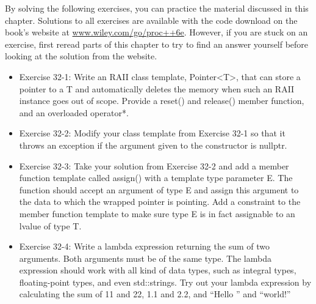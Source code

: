 By solving the following exercises, you can practice the material discussed in this chapter. Solutions to all exercises are available with the code download on the book’s website at \url{www.wiley.com/go/proc++6e}. However, if you are stuck on an exercise, first reread parts of this chapter to try to find an answer yourself before looking at the solution from the website.

\begin{itemize}
\item
Exercise 32-1: Write an RAII class template, Pointer<T>, that can store a pointer to a T and automatically deletes the memory when such an RAII instance goes out of scope. Provide a reset() and release() member function, and an overloaded operator*.

\item
Exercise 32-2: Modify your class template from Exercise 32-1 so that it throws an exception if the argument given to the constructor is nullptr.

\item
Exercise 32-3: Take your solution from Exercise 32-2 and add a member function template called assign() with a template type parameter E. The function should accept an argument of type E and assign this argument to the data to which the wrapped pointer is pointing. Add a constraint to the member function template to make sure type E is in fact assignable to an lvalue of type T.

\item
Exercise 32-4: Write a lambda expression returning the sum of two arguments. Both arguments must be of the same type. The lambda expression should work with all kind of data types, such as integral types, floating-point types, and even std::strings. Try out your lambda expression by calculating the sum of 11 and 22, 1.1 and 2.2, and “Hello ” and “world!”
\end{itemize}

